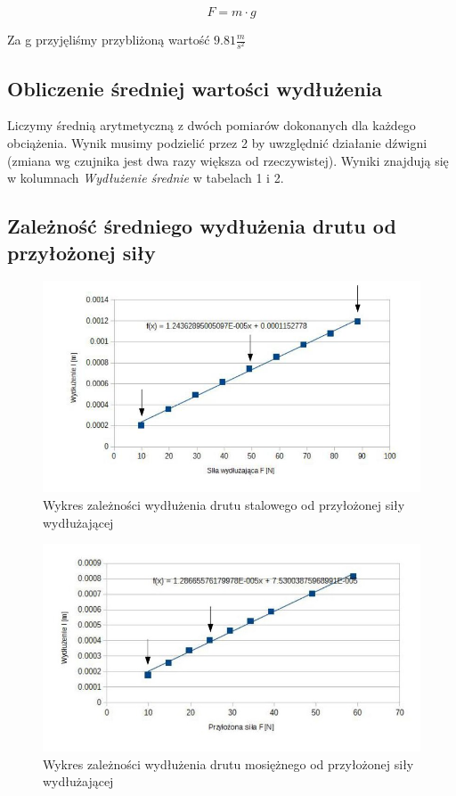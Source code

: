 \documentclass{article}
\begin{document}
\begin{equation}
	F = m \cdot g
\end{equation}

Za g przyjęliśmy przybliżoną wartość $9.81 \frac{m}{s^{2}}$

\subsection{Obliczenie średniej wartości wydłużenia}
Liczymy średnią arytmetyczną z dwóch pomiarów dokonanych dla każdego obciążenia. Wynik musimy podzielić przez 2 by uwzględnić działanie dźwigni (zmiana wg czujnika jest dwa razy większa od rzeczywistej). Wyniki znajdują się w kolumnach \emph{Wydłużenie średnie} w tabelach 1 i 2.
\clearpage
\subsection{Zależność średniego wydłużenia drutu od przyłożonej siły}

\begin{figure}[h!]
	\centering
	\includegraphics[scale=0.47]{ch01}
	\caption{Wykres zależności wydłużenia drutu stalowego od przyłożonej siły wydłużającej}
\end{figure}

\begin{figure}[h!]
	\centering
	\includegraphics[scale=0.47]{ch02}
	\caption{Wykres zależności wydłużenia drutu mosiężnego od przyłożonej siły wydłużającej}
\end{figure}
\end{document}
